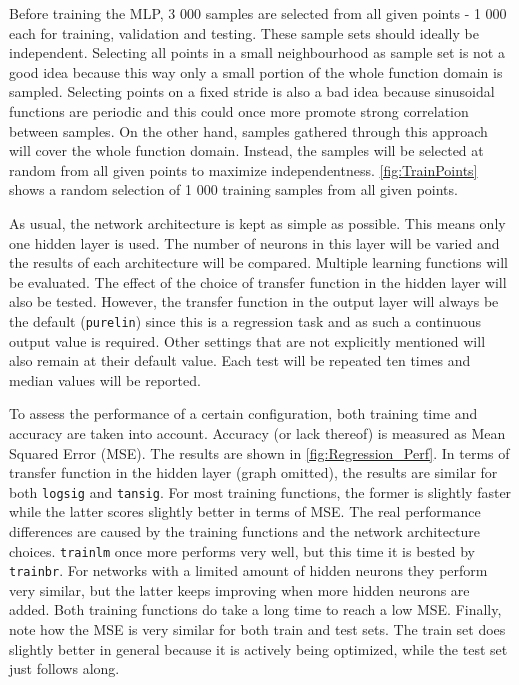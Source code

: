 \documentclass[a4, 10pt, twoside, twocolumn]{article}
\numberwithin{figure}{section}
\begin{document}
Before training the MLP, 3 000 samples are selected from all given points - 1 000 each for training, validation and testing. These sample sets should ideally be independent. Selecting all points in a small neighbourhood as sample set is not a good idea because this way only a small portion of the whole function domain is sampled. Selecting points on a fixed stride is also a bad idea because sinusoidal functions are periodic and this could once more promote strong correlation between samples. On the other hand, samples gathered through this approach will cover the whole function domain. Instead, the samples will be selected at random from all given points to maximize independentness. \autoref{fig:TrainPoints} shows a random selection of 1 000 training samples from all given points.

As usual, the network architecture is kept as simple as possible. This means only one hidden layer is used. The number of neurons in this layer will be varied and the results of each architecture will be compared. Multiple learning functions will be evaluated. The effect of the choice of transfer function in the hidden layer will also be tested. However, the transfer function in the output layer will always be the default (\texttt{purelin}) since this is a regression task and as such a continuous output value is required. Other settings that are not explicitly mentioned will also remain at their default value. Each test will be repeated ten times and median values will be reported.

To assess the performance of a certain configuration, both training time and accuracy are taken into account. Accuracy (or lack thereof) is measured as Mean Squared Error (MSE). The results are shown in \autoref{fig:Regression_Perf}. In terms of transfer function in the hidden layer (graph omitted), the results are similar for both \texttt{logsig} and \texttt{tansig}. For most training functions, the former is slightly faster while the latter scores slightly better in terms of MSE. The real performance differences are caused by the training functions and the network architecture choices. \texttt{trainlm} once more performs very well, but this time it is bested by \texttt{trainbr}. For networks with a limited amount of hidden neurons they perform very similar, but the latter keeps improving when more hidden neurons are added. Both training functions do take a long time to reach a low MSE. Finally, note how the MSE is very similar for both train and test sets. The train set does slightly better in general because it is actively being optimized, while the test set just follows along.
\end{document}
